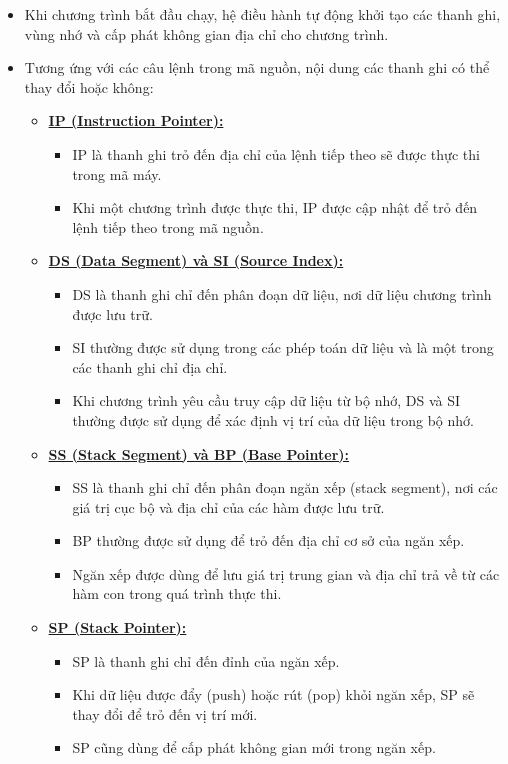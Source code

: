 \documentclass[12pt]{article}
\begin{document}
\begin{itemize}
  \item Khi chương trình bắt đầu chạy, hệ điều hành tự động khởi tạo các thanh ghi, vùng nhớ và cấp phát không gian địa chỉ cho chương trình.
  \item Tương ứng với các câu lệnh trong mã nguồn, nội dung các thanh ghi có thể thay đổi hoặc không:
  \begin{itemize}[label=]
    \item \textbf{\underline{IP (Instruction Pointer):}}
    \begin{itemize}
      \item IP là thanh ghi trỏ đến địa chỉ của lệnh tiếp theo sẽ được thực thi trong mã máy.
      \item Khi một chương trình được thực thi, IP được cập nhật để trỏ đến lệnh tiếp theo trong mã nguồn.
    \end{itemize}

    \item \textbf{\underline{DS (Data Segment) và SI (Source Index):}}
    \begin{itemize}
      \item DS là thanh ghi chỉ đến phân đoạn dữ liệu, nơi dữ liệu chương trình được lưu trữ.
      \item SI thường được sử dụng trong các phép toán dữ liệu và là một trong các thanh ghi chỉ địa chỉ.
      \item Khi chương trình yêu cầu truy cập dữ liệu từ bộ nhớ, DS và SI thường được sử dụng để xác định vị trí của dữ liệu trong bộ nhớ.
    \end{itemize}

    \item \textbf{\underline{SS (Stack Segment) và BP (Base Pointer):}}
    \begin{itemize}
      \item SS là thanh ghi chỉ đến phân đoạn ngăn xếp (stack segment), nơi các giá trị cục bộ và địa chỉ của các hàm được lưu trữ.
      \item BP thường được sử dụng để trỏ đến địa chỉ cơ sở của ngăn xếp.
      \item Ngăn xếp được dùng để lưu giá trị trung gian và địa chỉ trả về từ các hàm con trong quá trình thực thi.
    \end{itemize}

    \item \textbf{\underline{SP (Stack Pointer):}}
    \begin{itemize}
      \item SP là thanh ghi chỉ đến đỉnh của ngăn xếp.
      \item Khi dữ liệu được đẩy (push) hoặc rút (pop) khỏi ngăn xếp, SP sẽ thay đổi để trỏ đến vị trí mới.
      \item SP cũng dùng để cấp phát không gian mới trong ngăn xếp.
    \end{itemize}
  \end{itemize}



\end{itemize}
\end{document}
